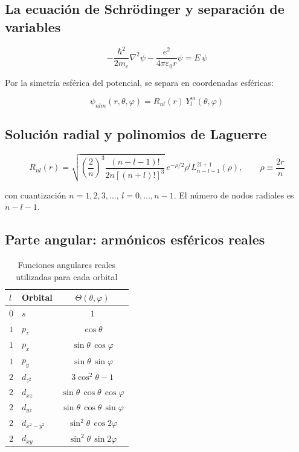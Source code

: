 \documentclass[12pt, a4paper]{article}
\begin{document}
\subsection{La ecuación de Schrödinger y separación de variables}

\begin{equation}
  \boxed{
  -\frac{\hbar^2}{2m_e}\nabla^2\psi - \frac{e^2}{4\pi\varepsilon_0 r}\psi = E\,\psi
  }
  \label{eq:schrodinger_h}
\end{equation}

Por la simetría esférica del potencial, se separa en coordenadas
esféricas:

\begin{equation}
  \psi_{nlm}(r,\theta,\varphi) = R_{nl}(r)\, Y_l^m(\theta,\varphi)
  \label{eq:separacion}
\end{equation}

\subsection{Solución radial y polinomios de Laguerre}

\begin{equation}
  R_{nl}(r) = \sqrt{\left(\frac{2}{n}\right)^3 \frac{(n-l-1)!}{2n[(n+l)!]^3}}\,
  e^{-\rho/2}\rho^l L_{n-l-1}^{2l+1}(\rho), \qquad \rho \equiv \frac{2r}{n}
  \label{eq:radial}
\end{equation}

con cuantización $n=1,2,3,\ldots$, $l=0,\ldots,n-1$. El número de
nodos radiales es $n-l-1$.

\subsection{Parte angular: armónicos esféricos reales}

\begin{table}[H]
  \centering
  \caption{Funciones angulares reales utilizadas para cada orbital}
  \begin{tabular}{llc}
    \toprule
    $l$ & Orbital & $\Theta(\theta,\varphi)$ \\
    \midrule
    $0$ & $s$        & $1$ \\
    $1$ & $p_z$      & $\cos\theta$ \\
    $1$ & $p_x$      & $\sin\theta\,\cos\varphi$ \\
    $1$ & $p_y$      & $\sin\theta\,\sin\varphi$ \\
    $2$ & $d_{z^2}$  & $3\cos^2\theta - 1$ \\
    $2$ & $d_{xz}$   & $\sin\theta\,\cos\theta\,\cos\varphi$ \\
    $2$ & $d_{yz}$   & $\sin\theta\,\cos\theta\,\sin\varphi$ \\
    $2$ & $d_{x^2-y^2}$ & $\sin^2\theta\,\cos2\varphi$ \\
    $2$ & $d_{xy}$   & $\sin^2\theta\,\sin2\varphi$ \\
    \bottomrule
  \end{tabular}
  \label{tab:angulares}
\end{table}
\end{document}
